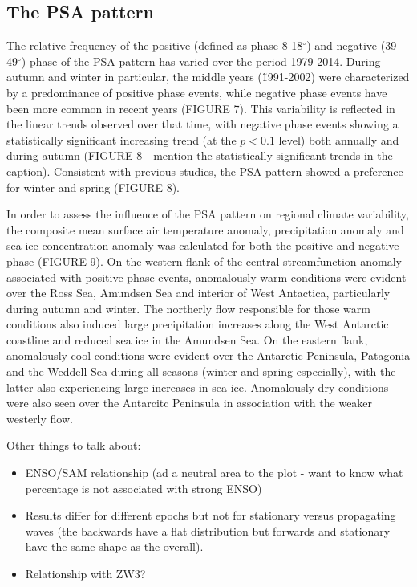 \subsection{The PSA pattern}

The relative frequency of the positive (defined as phase 8-18$^{\circ}$) and negative (39-49$^{\circ}$) phase of the PSA pattern has varied over the period 1979-2014. During autumn and winter in particular, the middle years (\~1991-2002) were characterized by a predominance of positive phase events, while negative phase events have been more common in recent years (FIGURE 7). This variability is reflected in the linear trends observed over that time, with negative phase events showing a statistically significant increasing trend (at the $p < 0.1$ level) both annually and during autumn (FIGURE 8 - mention the statistically significant trends in the caption). Consistent with previous studies, the PSA-pattern showed a preference for winter and spring (FIGURE 8).

In order to assess the influence of the PSA pattern on regional climate variability, the composite mean surface air temperature anomaly, precipitation anomaly and sea ice concentration anomaly was calculated for both the positive and negative phase (FIGURE 9). On the western flank of the central streamfunction anomaly associated with positive phase events, anomalously warm conditions were evident over the Ross Sea, Amundsen Sea and interior of West Antactica, particularly during autumn and winter. The northerly flow responsible for those warm conditions also induced large precipitation increases along the West Antarctic coastline and reduced sea ice in the Amundsen Sea. On the eastern flank, anomalously cool conditions were evident over the Antarctic Peninsula, Patagonia and the Weddell Sea during all seasons (winter and spring especially), with the latter also experiencing large increases in sea ice. Anomalously dry conditions were also seen over the Antarcitc Peninsula in association with the weaker westerly flow. 

Other things to talk about:
\begin{itemize}
\item ENSO/SAM relationship (ad a neutral area to the plot - want to know what percentage is not associated with strong ENSO)
\item Results differ for different epochs but not for stationary versus propagating waves (the backwards have a flat distribution but forwards and stationary have the same shape as the overall).
\item Relationship with ZW3?
\end{itemize}


